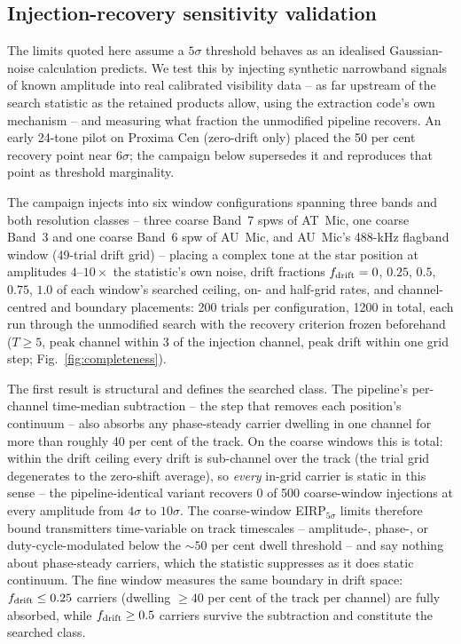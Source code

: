 \documentclass{openjournal}
\begin{document}
\subsection{Injection-recovery sensitivity validation}
\label{sec:injectrecovery}

The limits quoted here assume a $5\sigma$ threshold behaves as an
idealised Gaussian-noise calculation predicts. We test this by
injecting synthetic narrowband signals of known amplitude into real
calibrated visibility data -- as far upstream of the search statistic
as the retained products allow, using the extraction code's own
mechanism -- and measuring what fraction the unmodified pipeline
recovers. An early 24-tone pilot on Proxima Cen (zero-drift only)
placed the 50 per cent recovery point near $6\sigma$; the campaign
below supersedes it and reproduces that point as threshold
marginality.

The campaign injects into six window configurations spanning three
bands and both resolution classes -- three coarse Band~7 spws of
AT~Mic, one coarse Band~3 and one coarse Band~6 spw of AU~Mic, and
AU~Mic's 488-kHz flagband window (49-trial drift grid) -- placing a
complex tone at the star position at amplitudes $4$--$10\times$ the
statistic's own noise, drift fractions $f_{\rm drift}=0$, $0.25$,
$0.5$, $0.75$, $1.0$ of each window's searched ceiling, on- and
half-grid rates, and channel-centred and boundary placements: 200
trials per configuration, 1200 in total, each run through the
unmodified search with the recovery criterion frozen beforehand
($T\geq5$, peak channel within 3 of the injection channel, peak drift
within one grid step; Fig.~\ref{fig:completeness}).

The first result is structural and defines the searched class. The
pipeline's per-channel time-median subtraction -- the step that
removes each position's continuum -- also absorbs any phase-steady
carrier dwelling in one channel for more than roughly 40 per cent of
the track. On the coarse windows this is total: within the drift
ceiling every drift is sub-channel over the track (the trial grid
degenerates to the zero-shift average), so \emph{every} in-grid
carrier is static in this sense -- the pipeline-identical variant
recovers 0 of 500 coarse-window injections at every amplitude from
$4\sigma$ to $10\sigma$. The coarse-window EIRP$_{5\sigma}$ limits
therefore bound transmitters time-variable on track timescales --
amplitude-, phase-, or duty-cycle-modulated below the ${\sim}50$ per
cent dwell threshold -- and say nothing about phase-steady carriers,
which the statistic suppresses as it does static continuum. The fine
window measures the same boundary in drift space:
$f_{\rm drift}\leq0.25$ carriers (dwelling ${\geq}40$ per cent of the
track per channel) are fully absorbed, while $f_{\rm drift}\geq0.5$
carriers survive the subtraction and constitute the searched class.
\end{document}
